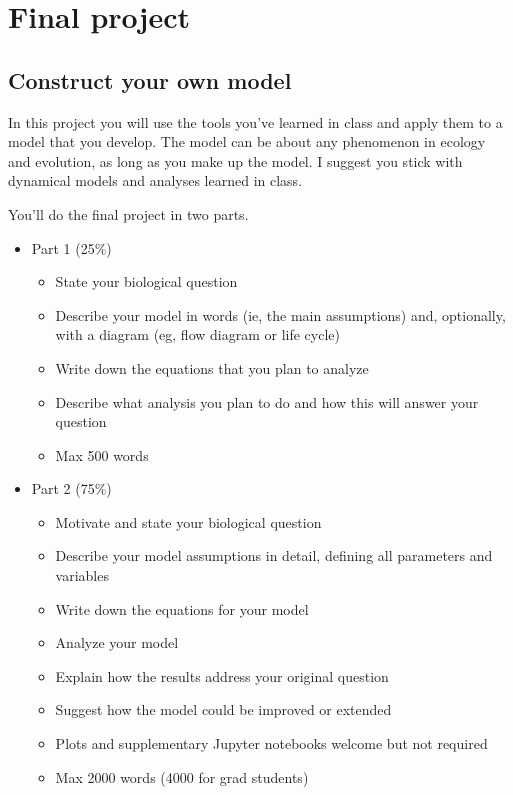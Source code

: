 \documentclass[
]{article}
\providecommand{\tightlist}{%
  \setlength{\itemsep}{0pt}\setlength{\parskip}{0pt}}
\begin{document}
\hypertarget{final-project}{%
\section{Final project}\label{final-project}}

\hypertarget{construct-your-own-model}{%
\subsection{Construct your own model}\label{construct-your-own-model}}

In this project you will use the tools you've learned in class and apply
them to a model that you develop. The model can be about any phenomenon
in ecology and evolution, as long as you make up the model. I suggest
you stick with dynamical models and analyses learned in class.

You'll do the final project in two parts.

\begin{itemize}
\tightlist
\item[$\textcolor{taskgreen}{\boxed{\checkmark}}$]
  Part 1 (25\%)

  \begin{itemize}
  \tightlist
  \item
    State your biological question
  \item
    Describe your model in words (ie, the main assumptions) and,
    optionally, with a diagram (eg, flow diagram or life cycle)
  \item
    Write down the equations that you plan to analyze
  \item
    Describe what analysis you plan to do and how this will answer your
    question
  \item
    Max 500 words
  \end{itemize}
\item[$\textcolor{taskgreen}{\boxed{\checkmark}}$]
  Part 2 (75\%)

  \begin{itemize}
  \tightlist
  \item
    Motivate and state your biological question
  \item
    Describe your model assumptions in detail, defining all parameters
    and variables
  \item
    Write down the equations for your model
  \item
    Analyze your model
  \item
    Explain how the results address your original question
  \item
    Suggest how the model could be improved or extended
  \item
    Plots and supplementary Jupyter notebooks welcome but not required
  \item
    Max 2000 words (4000 for grad students)
  \end{itemize}
\end{itemize}
\end{document}
